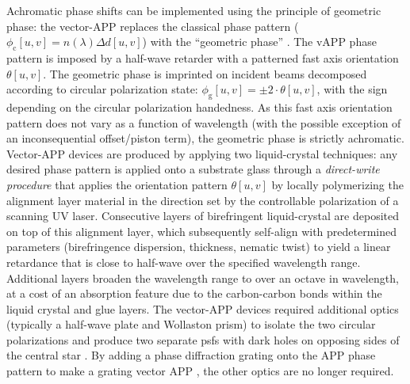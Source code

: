 \documentclass[letterpaper]{ar-1col}
\begin{document}
Achromatic phase shifts can be implemented using the principle of geometric phase: the vector-APP \citep[vAPP; ][]{Snik12} replaces the classical phase pattern ($\phi_{\textrm{c}}[u,v] =
n(\lambda) \Delta d[u,v]$) with the ``geometric phase'' \citep[known as the Pancharatnam-Berry phase; ][]{Pancharatnam,Berry}.
%
The vAPP phase pattern is imposed by a half-wave retarder with a patterned fast axis orientation $\theta[u,v]$.
%
The geometric phase is imprinted on incident beams decomposed according to circular polarization state: $\phi_{\textrm{g}}[u,v] = \pm2\cdot\theta[u,v]$, with the sign depending on the circular polarization handedness.
As this fast axis orientation pattern does not vary as a function of wavelength (with the possible exception of an inconsequential offset/piston term), the geometric phase is strictly achromatic.
%
%
Vector-APP devices are produced by applying two liquid-crystal techniques: any desired phase pattern is applied onto a substrate glass through a \textit{direct-write procedure} \citep{directwrite} that applies the orientation pattern $\theta[u,v]$ by locally polymerizing the alignment layer material in the direction set by the controllable polarization of a scanning UV laser.
%
Consecutive layers of birefringent liquid-crystal are deposited on top of this alignment layer, which subsequently self-align \citep[``\textit{Multi-Twist Retarders}''; MTR ][]{MTR} with predetermined parameters (birefringence dispersion, thickness, nematic twist) to yield a linear retardance that is close to half-wave over the specified wavelength range.
%
Additional layers broaden the wavelength range to over an octave in wavelength, at a cost of an absorption feature due to the carbon-carbon bonds within the liquid crystal and glue layers.
%
The vector-APP devices required additional optics (typically a half-wave plate and Wollaston prism) to isolate the two circular polarizations and produce two separate \acp{psf} with dark holes on opposing sides of the central star \citep{Snik12}.
%
By adding a phase diffraction grating onto the APP phase pattern to make a grating vector APP \citep[gvAPP; ][]{Snik12,Otten14}, the other optics are no longer required.
\end{document}
